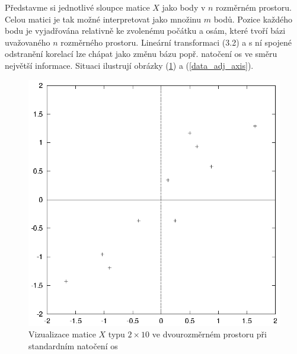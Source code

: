 \documentclass[a4paper]{book}
\begin{document}
Představme si jednotlivé sloupce matice $X$ jako body v $n$ rozměrném prostoru. Celou matici je tak možné interpretovat jako množinu $m$ bodů. Pozice každého bodu je vyjadřována relativně ke zvolenému počátku a osám, které tvoří bázi uvažovaného $n$ rozměrného prostoru. Lineární transformaci (3.2) a s ní spojené odstranění korelací lze chápat jako změnu bázu popř. natočení os ve směru největší informace. Situaci ilustrují obrázky (\ref{data_adj}) a (\ref{data_adj_axis}).
\begin{figure}
  \centering
  \includegraphics{data_adj.eps}
  \caption{Vizualizace matice $X$ typu $2 \times 10$ ve dvourozměrném prostoru při standardním natočení os}
  \label{data_adj}
\end{figure}
\end{document}
